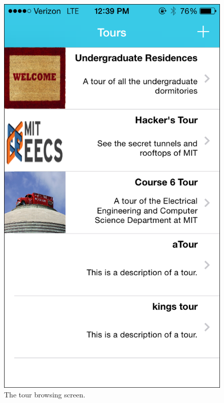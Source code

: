 \documentclass{sigchi}
\begin{document}
\begin{figure}
\centering
\includegraphics[width=1.0\linewidth]{./TourBrowser}
\caption{The tour browsing screen.}
\label{fig:TourBrowser}
\end{figure}
\end{document}
